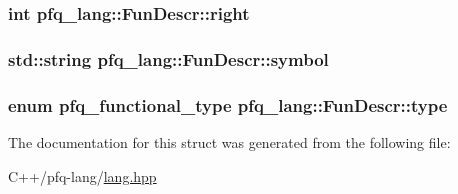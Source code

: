 \hypertarget{structpfq__lang_1_1FunDescr_afaca33d533c4668acfd5e6aea52026b4}{
\subsubsection[{right}]{\setlength{\rightskip}{0pt plus 5cm}int pfq\+\_\+lang\+::\+Fun\+Descr\+::right}}\label{structpfq__lang_1_1FunDescr_afaca33d533c4668acfd5e6aea52026b4}
\hypertarget{structpfq__lang_1_1FunDescr_a7d95e70cba06a41f63bcc960900c83ff}{
\subsubsection[{symbol}]{\setlength{\rightskip}{0pt plus 5cm}std\+::string pfq\+\_\+lang\+::\+Fun\+Descr\+::symbol}}\label{structpfq__lang_1_1FunDescr_a7d95e70cba06a41f63bcc960900c83ff}
\hypertarget{structpfq__lang_1_1FunDescr_a48a16971f3d255aed8551bc0690913cf}{
\subsubsection[{type}]{\setlength{\rightskip}{0pt plus 5cm}enum pfq\+\_\+functional\+\_\+type pfq\+\_\+lang\+::\+Fun\+Descr\+::type}}\label{structpfq__lang_1_1FunDescr_a48a16971f3d255aed8551bc0690913cf}


The documentation for this struct was generated from the following file\+:\begin{DoxyCompactItemize}
\item 
C++/pfq-\/lang/\hyperlink{lang_8hpp}{lang.\+hpp}\end{DoxyCompactItemize}
